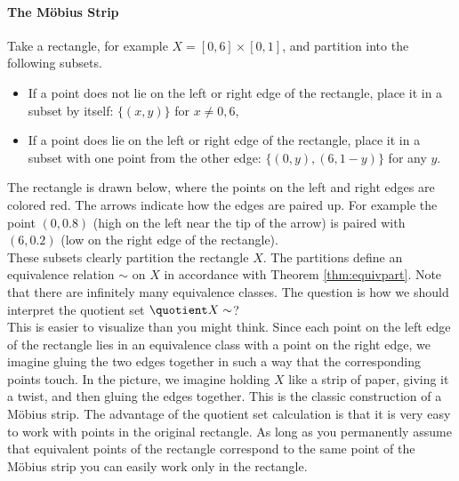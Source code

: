 \paragraph{The Möbius Strip}

Take a rectangle, for example $X=[0,6]\times[0,1]$, and partition into the following subsets.
\begin{itemize}
\item If a point does not lie on the left or right edge of the rectangle, place it in a subset by itself: $\{(x,y)\}$ for $x\neq 0,6$,
\item If a point does lie on the left or right edge of the rectangle, place it in a subset with one point from the other edge: $\{(0,y),(6,1-y)\}$ for any $y$.
\end{itemize}
The rectangle is drawn below, where the points on the left and right edges are colored red. The arrows indicate how the edges are paired up. For example the point $(0,0.8)$ (high on the left near the tip of the arrow) is paired with $(6,0.2)$ (low on the right edge of the rectangle).\\
These subsets clearly partition the rectangle $X$. The partitions define an equivalence relation $\sim$ on $X$ in accordance with Theorem \ref{thm:equivpart}. Note that there are infinitely many equivalence classes. The question is how we should interpret the quotient set $\quotient X\sim$?\\
This is easier to visualize than you might think. Since each point on the left edge of the rectangle lies in an equivalence class with a point on the right edge, we imagine gluing the two edges together in such a way that the corresponding points touch. In the picture, we imagine holding $X$ like a strip of paper, giving it a twist, and then gluing the edges together. This is the classic construction of a Möbius strip. The advantage of the quotient set calculation is that it is very easy to work with points in the original rectangle. As long as you permanently assume that equivalent points of the rectangle correspond to the same point of the Möbius strip you can easily work only in the rectangle.\\[5pt]

